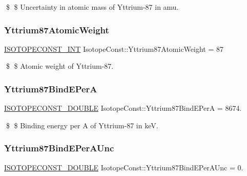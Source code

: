 \$ \$ Uncertainty in atomic mass of Yttrium-\/87 in amu. \mbox{\label{group___isotope_const-_yttrium-_y87_ga56ae6c99eee91d45bb20532ae1a04649}} 
\subsubsection{\texorpdfstring{Yttrium87\+Atomic\+Weight}{Yttrium87AtomicWeight}}
{\footnotesize\ttfamily \mbox{\hyperlink{group___isotope_const-_macros_ga5f18360b3e99483a35c32d789e62621c}{I\+S\+O\+T\+O\+P\+E\+C\+O\+N\+S\+T\+\_\+\+I\+NT}} Isotope\+Const\+::\+Yttrium87\+Atomic\+Weight = 87}

\$ \$ Atomic weight of Yttrium-\/87. \mbox{\label{group___isotope_const-_yttrium-_y87_ga92e50577ac3ea62aaa27ec255158362a}} 
\subsubsection{\texorpdfstring{Yttrium87\+Bind\+E\+PerA}{Yttrium87BindEPerA}}
{\footnotesize\ttfamily \mbox{\hyperlink{group___isotope_const-_macros_ga8f45a7272ce02c0b4c65c44636ed719a}{I\+S\+O\+T\+O\+P\+E\+C\+O\+N\+S\+T\+\_\+\+D\+O\+U\+B\+LE}} Isotope\+Const\+::\+Yttrium87\+Bind\+E\+PerA = 8674.}

\$ \$ Binding energy per A of Yttrium-\/87 in keV. \mbox{\label{group___isotope_const-_yttrium-_y87_ga1e419cb7375590713cd84d07e1924bbd}} 
\subsubsection{\texorpdfstring{Yttrium87\+Bind\+E\+Per\+A\+Unc}{Yttrium87BindEPerAUnc}}
{\footnotesize\ttfamily \mbox{\hyperlink{group___isotope_const-_macros_ga8f45a7272ce02c0b4c65c44636ed719a}{I\+S\+O\+T\+O\+P\+E\+C\+O\+N\+S\+T\+\_\+\+D\+O\+U\+B\+LE}} Isotope\+Const\+::\+Yttrium87\+Bind\+E\+Per\+A\+Unc = 0.}

